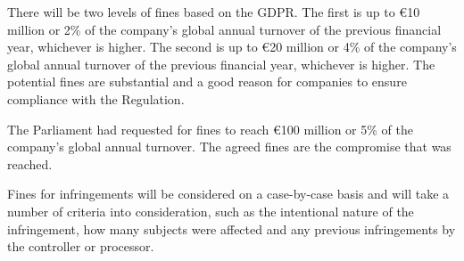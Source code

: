 \documentclass[a4paper,12pt]{article}
\begin{document}
There will be two levels of fines based on the GDPR.  The first is up to €10 million or 2\% of the company’s global annual turnover of the previous financial year, whichever is higher.  The second is up to €20 million or 4\% of the company’s global annual turnover of the previous financial year, whichever is higher.  The potential fines are substantial and a good reason for companies to ensure compliance with the Regulation.

The Parliament had requested for fines to reach €100 million or 5\% of the company’s global annual turnover.  The agreed fines are the compromise that was reached.

Fines for infringements will be considered on a case-by-case basis and will take a number of criteria into consideration, such as the intentional nature of the infringement, how many subjects were affected and any previous infringements by the controller or processor.

\clearpage

\printindex
\end{document}
